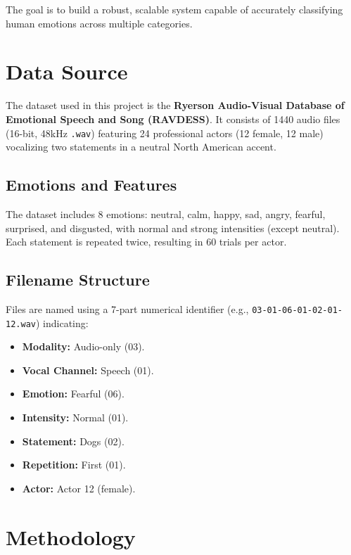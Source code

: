 \documentclass{article}
\begin{document}
The goal is to build a robust, scalable system capable of accurately classifying human emotions across multiple 
categories.

\section{Data Source}

The dataset used in this project is the \textbf{Ryerson Audio-Visual Database of Emotional Speech and Song (RAVDESS)}. 
It consists of 1440 audio files (16-bit, 48kHz \texttt{.wav}) featuring 24 professional actors (12 female, 12 male) 
vocalizing two statements in a neutral North American accent. 

\subsection{Emotions and Features}
The dataset includes 8 emotions: neutral, calm, happy, sad, angry, fearful, surprised, and disgusted, with normal and 
strong intensities (except neutral). Each statement is repeated twice, resulting in 60 trials per actor.

\subsection{Filename Structure}
Files are named using a 7-part numerical identifier (e.g., \texttt{03-01-06-01-02-01-12.wav}) indicating:
\begin{itemize}
    \item \textbf{Modality:} Audio-only (03).
    \item \textbf{Vocal Channel:} Speech (01).
    \item \textbf{Emotion:} Fearful (06).
    \item \textbf{Intensity:} Normal (01).
    \item \textbf{Statement:} Dogs (02).
    \item \textbf{Repetition:} First (01).
    \item \textbf{Actor:} Actor 12 (female).
\end{itemize}

\section{Methodology}
\end{document}
